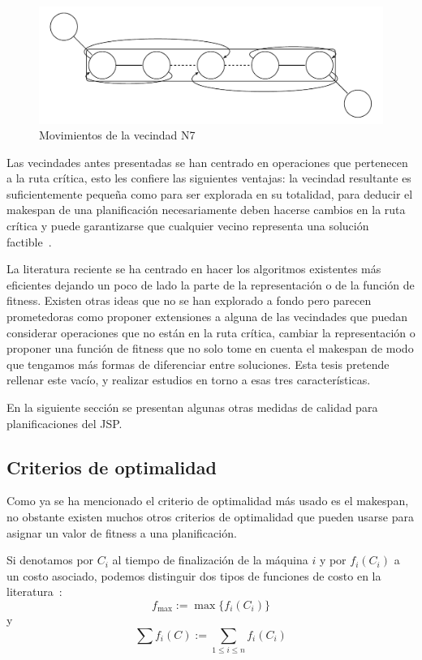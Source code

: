 \begin{itemize}
\begin{figure}[H]
\centering
\includegraphics[scale=.7]{Imagenes/N7.pdf}
\caption{Movimientos de la vecindad N7}
\end{figure}
\end{itemize}

Las vecindades antes presentadas se han centrado en operaciones que pertenecen a la ruta crítica, esto les confiere las siguientes ventajas: la vecindad resultante es 
suficientemente pequeña como para ser explorada en su totalidad, para deducir el makespan de una planificación necesariamente deben hacerse cambios en la ruta crítica 
y puede garantizarse que cualquier vecino representa una solución factible~\cite{balas1969machine}.

La literatura reciente se ha centrado en hacer los algoritmos existentes más eficientes dejando un poco de lado la parte de la representación o de la función de fitness. 
%
Existen otras ideas que no se han explorado a fondo pero parecen prometedoras como proponer extensiones a alguna de las vecindades que puedan considerar operaciones
que no están en la ruta crítica, cambiar la representación o proponer una función de fitness que no solo tome en cuenta el makespan de modo que tengamos más formas de 
diferenciar entre soluciones. 
%
Esta tesis pretende rellenar este vacío, y realizar estudios en torno a esas tres características.

En la siguiente sección se presentan algunas otras medidas de calidad para planificaciones del JSP.

\subsection*{Criterios de optimalidad}
Como ya se ha mencionado el criterio de optimalidad más usado es el makespan, no obstante existen muchos otros criterios de optimalidad que pueden usarse para 
asignar un valor de fitness a una planificación. 

Si denotamos por $C_i$ al tiempo de finalización de la máquina $i$ y por $f_i(C_i)$ a un costo asociado, podemos distinguir dos tipos de funciones de 
costo en la literatura~\cite{Brucker2001}:
\[f_{\max}:=\max\{f_i(C_i)\}\]
y 
\[\sum f_i(C):=\sum_{1\leq i\leq n}f_i(C_i)\]

